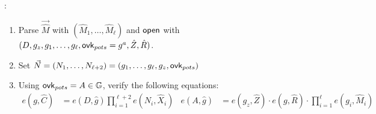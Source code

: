 \begin{description}
\item[] :
  \begin{enumerate}
  \item Parse $\vec{\hat{M}}$ with $(\hat{M}_1, \dots, \hat{M}_\ell)$ and $\mathsf{open}$ with $(D, g_z, g_1, \dots, g_\ell, \mathsf{ovk}_{pots} = g^a, \hat{Z}, \hat{R})$.
  \item Set $\vec{N} = (N_1, \dots, N_{\ell+2}) = (g_1, \dots, g_\ell, g_z, \mathsf{ovk}_{pots})$
  \item Using $\mathsf{ovk}_{pots} = A \in \mathbb{G}$, verify the following equations:
    \begin{align*}
      e(g, \hat{C}) &= e(D, \hat{g}) \prod_{i = 1}^{\ell+2} e(N_i, \hat{X}_i) & e(A, \hat{g}) &= e(g_z, \hat{Z}) \cdot e(g, \hat{R}) \cdot \prod_{i = 1}^\ell e(g_i, \hat{M}_i) 
    \end{align*}
  \end{enumerate}
\end{description}
